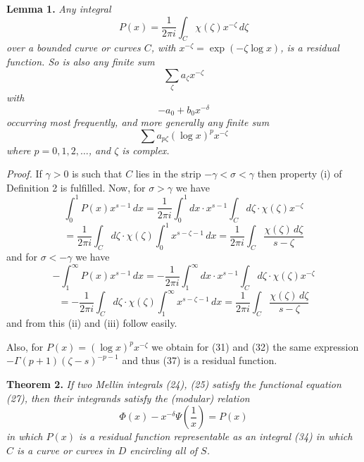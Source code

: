 \documentclass[12pt]{article}
\begin{document}
\medskip

\noindent\textbf{Lemma 1.} \emph{Any integral}
\begin{equation}
P(x) = \frac{1}{2\pi i} \int_C \chi(\zeta) x^{-\zeta} \, d\zeta
\tag{34}
\end{equation}
\emph{over a bounded curve or curves \(C\), with \(x^{-\zeta} = \exp(-\zeta \log x)\), is a residual function. So is also any finite sum}
\begin{equation}
\sum_\zeta a_\zeta x^{-\zeta}
\tag{35}
\end{equation}
\emph{with}
\begin{equation}
-a_0 + b_0 x^{-\delta}
\tag{36}
\end{equation}
\emph{occurring most frequently, and more generally any finite sum}
\begin{equation}
\sum a_{p\zeta} (\log x)^p x^{-\zeta}
\tag{37}
\end{equation}
\emph{where \(p = 0, 1, 2, \dots\), and \(\zeta\) is complex.}

\medskip

\noindent\emph{Proof.} If \(\gamma > 0\) is such that \(C\) lies in the strip \(-\gamma < \sigma < \gamma\) then property (i) of Definition 2 is fulfilled. Now, for \(\sigma > \gamma\) we have
\[
\int_0^1 P(x) x^{s-1} \, dx = \frac{1}{2\pi i} \int_0^1 dx \cdot x^{s-1} \int_C d\zeta \cdot \chi(\zeta) x^{-\zeta}
\]
\[
= \frac{1}{2\pi i} \int_C d\zeta \cdot \chi(\zeta) \int_0^1 x^{s-\zeta-1} \, dx = \frac{1}{2\pi i} \int_C \frac{\chi(\zeta) \, d\zeta}{s - \zeta}
\]
and for \(\sigma < -\gamma\) we have
\[
-\int_1^{\infty} P(x) x^{s-1} \, dx = -\frac{1}{2\pi i} \int_1^{\infty} dx \cdot x^{s-1} \int_C d\zeta \cdot \chi(\zeta) x^{-\zeta}
\]
\[
= -\frac{1}{2\pi i} \int_C d\zeta \cdot \chi(\zeta) \int_1^{\infty} x^{s-\zeta-1} \, dx = \frac{1}{2\pi i} \int_C \frac{\chi(\zeta) \, d\zeta}{s - \zeta}
\]
and from this (ii) and (iii) follow easily.

Also, for \(P(x) = (\log x)^p x^{-\zeta}\) we obtain for (31) and (32) the same expression \(-\Gamma(p + 1) (\zeta - s)^{-p-1}\) and thus (37) is a residual function.

\medskip

\noindent\textbf{Theorem 2.} \emph{If two Mellin integrals (24), (25) satisfy the functional equation (27), then their integrands satisfy the (modular) relation}
\begin{equation}
\Phi(x) - x^{-\delta} \Psi \left( \frac{1}{x} \right) = P(x)
\tag{38}
\end{equation}
\emph{in which \(P(x)\) is a residual function representable as an integral (34) in which \(C\) is a curve or curves in \(D\) encircling all of \(S\).}
\end{document}
